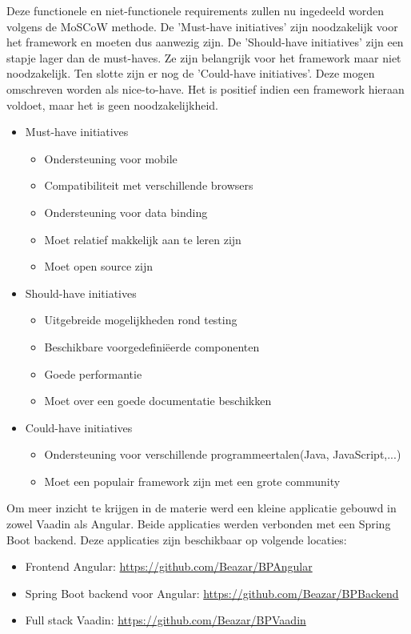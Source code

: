 Deze functionele en niet-functionele requirements zullen nu ingedeeld worden volgens de MoSCoW methode.\autocite{ProductPlan2019}
De 'Must-have initiatives' zijn noodzakelijk voor het framework en moeten dus aanwezig zijn.
De 'Should-have initiatives' zijn een stapje lager dan de must-haves. Ze zijn belangrijk voor het framework maar niet noodzakelijk.
Ten slotte zijn er nog de 'Could-have initiatives'. Deze mogen omschreven worden als nice-to-have. Het is positief indien een framework hieraan voldoet, maar het is geen noodzakelijkheid.

\begin{itemize}
	\item  Must-have initiatives
	\begin{itemize}
	\item Ondersteuning voor mobile
	\item Compatibiliteit met verschillende browsers
	\item Ondersteuning voor data binding
	\item Moet relatief makkelijk aan te leren zijn
	\item Moet open source zijn	 
	\end{itemize}
	\item Should-have initiatives
	\begin{itemize}
	\item Uitgebreide mogelijkheden rond testing
	\item Beschikbare voorgedefiniëerde componenten 
	\item Goede performantie
	\item Moet over een goede documentatie beschikken
	\end{itemize}
		\item Could-have initiatives
		\begin{itemize}
	\item Ondersteuning voor verschillende programmeertalen(Java, JavaScript,...)
	\item Moet een populair framework zijn met een grote community
		\end{itemize}
\end{itemize}

Om meer inzicht te krijgen in de materie werd een kleine applicatie gebouwd in zowel Vaadin als Angular. Beide applicaties werden verbonden met een Spring Boot backend. Deze applicaties zijn beschikbaar op volgende locaties:
\begin{itemize}
	\item Frontend Angular: \url{https://github.com/Beazar/BPAngular}
	\item Spring Boot backend voor Angular: \url{https://github.com/Beazar/BPBackend}
	\item Full stack Vaadin: \url{https://github.com/Beazar/BPVaadin}
\end{itemize}
